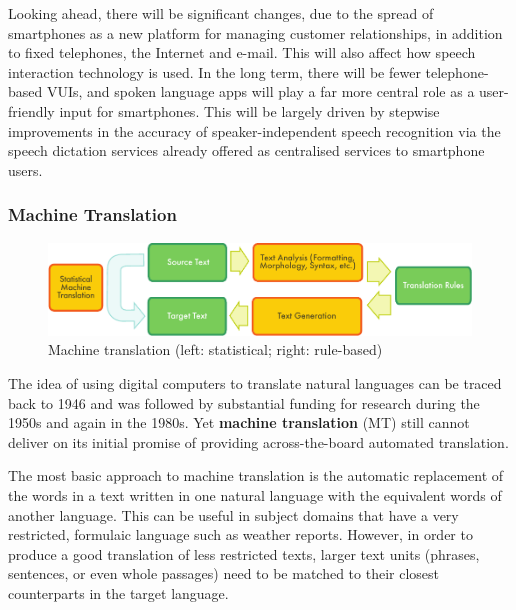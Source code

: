 \begin{multicols}{2}
Looking ahead, there will be significant changes, due to the spread of smartphones as a new platform for managing customer relationships, in addition to fixed telephones, the Internet and e-mail. This will also affect how speech interaction technology is used. In the long term, there will be fewer telephone-based VUIs, and spoken language apps will play a far more central role as a user-friendly input for smartphones. This will be largely driven by stepwise improvements in the accuracy of speaker-independent speech recognition via the speech dictation services already offered as centralised services to smartphone users.

\subsubsection{Machine Translation}

\begin{figure}[htb]
  \center
  \includegraphics[width=\textwidth]{../_media/english/machine_translation}
  \caption{Machine translation (left: statistical; right: rule-based)}
  \label{fig:mtarch_en}
\end{figure}

The idea of using digital computers to translate natural languages can be traced back to 1946 and was followed by substantial funding for research during the 1950s and again in the 1980s. 
Yet \textbf{machine translation} (MT) still cannot deliver on its initial promise of providing across-the-board automated translation.  

The most basic approach to machine translation is the automatic replacement of the words in a text written in one natural language with the equivalent words of another language. This can be useful in subject domains that have a very restricted, formulaic language such as weather reports.
However, in order to produce a good translation of less restricted texts, larger text units (phrases, sentences, or even whole passages) need to be matched to their closest counterparts in the target language. 



\end{multicols}
